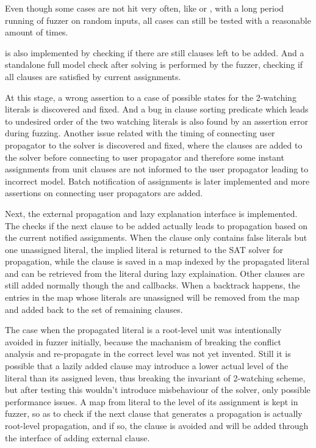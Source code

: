 Even though some cases are not hit very often, like  or , with a long period running of fuzzer on random inputs, all cases can still be tested with a reasonable amount of times.

 is also implemented by checking if there are still clauses left to be added. And a standalone full model check after solving is performed by the fuzzer, checking if all clauses are satisfied by current assignments.

At this stage, a wrong assertion to a case of possible states for the 2-watching literals is discovered and fixed. And a bug in clause sorting predicate which leads to undesired order of the two watching literals is also found by an assertion error during fuzzing. Another issue related with the timing of connecting user propagator to the solver is discovered and fixed, where the clauses are added to the solver before connecting to user propagator and therefore some instant assignments from unit clauses are not informed to the user propagator leading to incorrect model. Batch notification of assignments is later implemented and more assertions on connecting user propagators are added.

Next, the external propagation and lazy explanation interface is implemented. The  checks if the next clause to be added actually leads to propagation based on the current notified assignments. When the clause only contains false literals but one unassigned literal, the implied literal is returned to the SAT solver for propagation, while the clause is saved in a map indexed by the propagated literal and can be retrieved from the literal during lazy explaination. Other clauses are still added normally though the  and  callbacks. When a backtrack happens, the entries in the map whose literals are unassigned will be removed from the map and added back to the set of remaining clauses.

The case when the propagated literal is a root-level unit was intentionally avoided in fuzzer initially, because the machanism of breaking the conflict analysis and re-propagate in the correct level was not yet invented. Still it is possible that a lazily added clause may introduce a lower actual level of the literal than its assigned leven, thus breaking the invariant of 2-watching scheme, but after testing this wouldn't introduce misbehaviour of the solver, only possible performance issues. A map from literal to the level of its assignment is kept in fuzzer, so as to check if the next clause that generates a propagation is actually root-level propagation, and if so, the clause is avoided and will be added through the interface of adding external clause.

